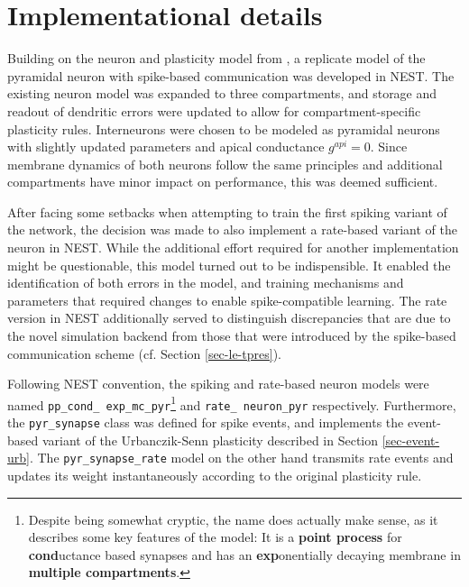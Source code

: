 \section{Implementational details}

Building on the neuron and plasticity model from \citep{Stapmanns2021}, a replicate model of the pyramidal neuron with
spike-based communication was developed in NEST. The existing neuron model was expanded to three compartments, and
storage and readout of dendritic errors were updated  to allow for compartment-specific plasticity rules. Interneurons
were chosen to be modeled as pyramidal neurons with slightly updated parameters and apical conductance $g^{api}=0$.
Since membrane dynamics of both neurons follow the same principles and additional compartments have minor impact on
performance, this was deemed sufficient.

After facing some setbacks when attempting to train the first spiking variant of the network, the decision was made to
also implement a rate-based variant of the neuron in NEST.  While the additional effort required for another
implementation might be questionable, this model turned out to be indispensible. It enabled the identification of both
errors in the model, and training mechanisms and parameters that required changes to enable spike-compatible
learning. The rate version in NEST additionally served to distinguish discrepancies that are due to the novel simulation
backend from those that were introduced by the spike-based communication scheme (cf. Section \ref{sec-le-tpres}).

Following NEST convention, the spiking and rate-based neuron models were named \texttt{pp\_\allowbreak cond\_\allowbreak
  exp\_\allowbreak mc\_\allowbreak pyr}\footnote{Despite being somewhat cryptic, the name does actually make sense, as
  it describes some key features of the model: It is a \textbf{point process} for \textbf{cond}uctance based synapses
  and has an \textbf{exp}onentially decaying membrane in \textbf{multiple compartments}.} and \texttt{rate\_\allowbreak
  neuron\_\allowbreak pyr} respectively. Furthermore, the \texttt{pyr\_\allowbreak synapse} class was defined for spike
  events, and implements the event-based variant of the Urbanczik-Senn plasticity described in Section
  \ref{sec-event-urb}. The \texttt{pyr\_\allowbreak synapse\_\allowbreak rate} model on the other hand transmits rate
  events and updates its weight instantaneously according to the original plasticity rule.

